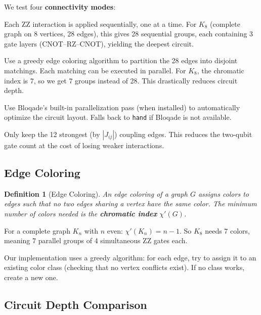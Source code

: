 \documentclass[12pt, a4paper]{article}
\newtheorem{definition}{Definition}[section]
\begin{document}
We test four \textbf{connectivity modes}:

\begin{description}[leftmargin=2.5cm]
    \item[naive] Each ZZ interaction is applied sequentially, one at a time.
    For $K_8$ (complete graph on 8 vertices, 28 edges), this gives 28 sequential
    groups, each containing 3 gate layers (CNOT--RZ--CNOT), yielding the deepest
    circuit.

    \item[hand] Use a greedy edge coloring algorithm to partition the 28 edges
    into disjoint matchings. Each matching can be executed in parallel. For $K_8$,
    the chromatic index is 7, so we get 7 groups instead of 28. This drastically
    reduces circuit depth.

    \item[auto] Use Bloqade's built-in parallelization pass (when installed) to
    automatically optimize the circuit layout. Falls back to \texttt{hand} if
    Bloqade is not available.

    \item[pruned] Only keep the 12 strongest (by $|J_{ij}|$) coupling edges. This
    reduces the two-qubit gate count at the cost of losing weaker interactions.
\end{description}

\subsection{Edge Coloring}

\begin{definition}[Edge Coloring]
An edge coloring of a graph $G$ assigns colors to edges such that no two edges
sharing a vertex have the same color. The minimum number of colors needed is
the \textbf{chromatic index} $\chi'(G)$.
\end{definition}

For a complete graph $K_n$ with $n$ even: $\chi'(K_n) = n - 1$. So $K_8$ needs
7 colors, meaning 7 parallel groups of 4 simultaneous ZZ gates each.

Our implementation uses a greedy algorithm: for each edge, try to assign it to
an existing color class (checking that no vertex conflicts exist). If no class
works, create a new one.

\subsection{Circuit Depth Comparison}
\end{document}
